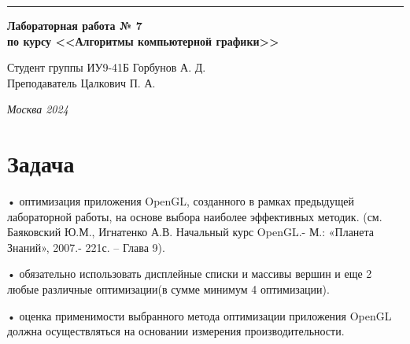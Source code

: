 \documentclass[a4paper, 14pt]{extarticle}
\begin{document}
\begin{titlepage}
\vspace*{-16pt}
\hspace{30pt}\rule{0.866\textwidth}{0.4pt}
  
\vspace{11em}

\begin{center}
\Large {\bf Лабораторная работа № 7} \\ 
\large {\bf по курсу <<Алгоритмы компьютерной графики>>}\\
\end{center}\normalsize

\vspace{8em}


\begin{flushright}
  {Студент группы ИУ9-41Б Горбунов А. Д.\hspace*{15pt} \\
  \vspace{2ex}
  Преподаватель Цалкович П. А.\hspace*{15pt}}
\end{flushright}

\bigskip

\vfill
 

\begin{center}
\textsl{Москва 2024}
\end{center}
\end{titlepage}

\renewcommand{\ttdefault}{pcr}

\setlength{\tabcolsep}{3pt}
\newpage
\setcounter{page}{2}

\section{Задача}\label{Sect::task}
\par

• оптимизация приложения OpenGL, созданного в рамках предыдущей лабораторной работы, на основе выбора наиболее эффективных методик. (см. Баяковский Ю.М., Игнатенко А.В. Начальный курс OpenGL.- М.: «Планета Знаний», 2007.- 221с. – Глава 9).
    
• обязательно использовать дисплейные списки и массивы вершин и еще 2 любые различные оптимизации(в сумме минимум 4 оптимизации).

• оценка применимости выбранного метода оптимизации приложения OpenGL должна осуществляться на основании измерения производительности.
\end{document}
